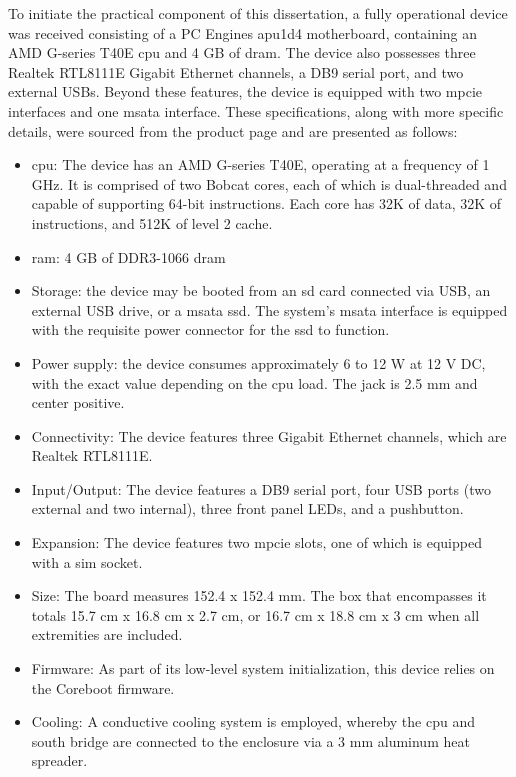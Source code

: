 To initiate the practical component of this dissertation, a fully operational device was received consisting of a PC Engines apu1d4 motherboard, containing an AMD G-series T40E \gls{cpu} and 4 GB of \gls{dram}. The device also possesses three Realtek RTL8111E Gigabit Ethernet channels, a DB9 serial port, and two external USBs. Beyond these features, the device is equipped with two \gls{mpcie} interfaces and one \gls{msata} interface. 
These specifications, along with more specific details, were sourced from the product page and are presented as follows:

\begin{itemize}
    \item \gls{cpu}: The device has an AMD G-series T40E, operating at a frequency of 1 GHz. It is comprised of two Bobcat cores, each of which is dual-threaded and capable of supporting 64-bit instructions. Each core has 32K of data, 32K of instructions, and 512K of level 2 cache.
    \item \gls{ram}: 4 GB of DDR3-1066 \gls{dram}
    \item Storage: the device may be booted from an \gls{sd} card connected via USB, an external USB drive, or a \gls{msata} \gls{ssd}. The system's \gls{msata} interface is equipped with the requisite power connector for the \gls{ssd} to function.
    \item Power supply: the device consumes approximately 6 to 12 W at 12 V DC, with the exact value depending on the \gls{cpu} load. The jack is 2.5 mm and center positive.
    \item Connectivity: The device features three Gigabit Ethernet channels, which are Realtek RTL8111E.
    \item Input/Output: The device features a DB9 serial port, four USB ports (two external and two internal), three front panel LEDs, and a pushbutton.
    \item Expansion: The device features two \gls{mpcie} slots, one of which is equipped with a \gls{sim} socket. 
    \item Size: The board measures 152.4 x 152.4 mm. The box that encompasses it totals 15.7 cm x 16.8 cm x 2.7 cm, or 16.7 cm x 18.8 cm x 3 cm when all extremities are included.
    \item Firmware: As part of its low-level system initialization, this device relies on the Coreboot firmware.
    \item Cooling: A conductive cooling system is employed, whereby the \gls{cpu} and south bridge are connected to the enclosure via a 3 mm aluminum heat spreader.
\end{itemize}


